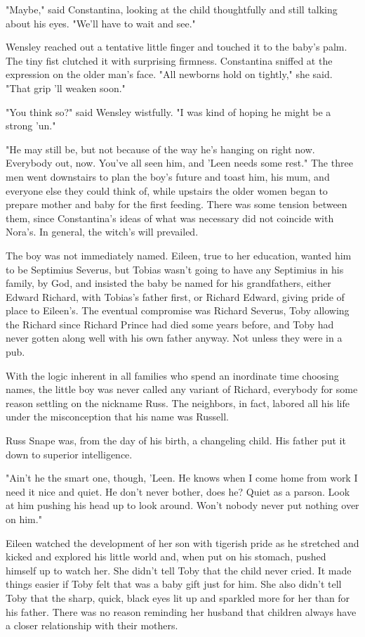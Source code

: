 "Maybe," said Constantina, looking at the child thoughtfully and still talking about his eyes. "We'll have to wait and see."

Wensley reached out a tentative little finger and touched it to the baby's palm. The tiny fist clutched it with surprising firmness. Constantina sniffed at the expression on the older man's face. "All newborns hold on tightly," she said. "That grip 'll weaken soon."

"You think so?" said Wensley wistfully. "I was kind of hoping he might be a strong 'un."

"He may still be, but not because of the way he's hanging on right now. Everybody out, now. You've all seen him, and 'Leen needs some rest." The three men went downstairs to plan the boy's future and toast him, his mum, and everyone else they could think of, while upstairs the older women began to prepare mother and baby for the first feeding. There was some tension between them, since Constantina's ideas of what was necessary did not coincide with Nora's. In general, the witch's will prevailed.

The boy was not immediately named. Eileen, true to her education, wanted him to be Septimius Severus, but Tobias wasn't going to have any Septimius in his family, by God, and insisted the baby be named for his grandfathers, either Edward Richard, with Tobias's father first, or Richard Edward, giving pride of place to Eileen's. The eventual compromise was Richard Severus, Toby allowing the Richard since Richard Prince had died some years before, and Toby had never gotten along well with his own father anyway. Not unless they were in a pub.

With the logic inherent in all families who spend an inordinate time choosing names, the little boy was never called any variant of Richard, everybody for some reason settling on the nickname Russ. The neighbors, in fact, labored all his life under the misconception that his name was Russell.

Russ Snape was, from the day of his birth, a changeling child. His father put it down to superior intelligence.

"Ain't he the smart one, though, 'Leen. He knows when I come home from work I need it nice and quiet. He don't never bother, does he? Quiet as a parson. Look at him pushing his head up to look around. Won't nobody never put nothing over on him."

Eileen watched the development of her son with tigerish pride as he stretched and kicked and explored his little world and, when put on his stomach, pushed himself up to watch her. She didn't tell Toby that the child never cried. It made things easier if Toby felt that was a baby gift just for him. She also didn't tell Toby that the sharp, quick, black eyes lit up and sparkled more for her than for his father. There was no reason reminding her husband that children always have a closer relationship with their mothers.

